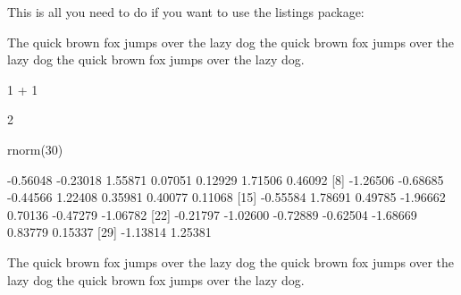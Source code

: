 \documentclass{article}\usepackage{graphicx, color}
\begin{document}
This is all you need to do if you want to use the listings package:




The quick brown fox jumps over the lazy dog the quick brown fox jumps over the
lazy dog the quick brown fox jumps over the lazy dog.

\begin{Schunk}
\begin{Sinput}
1 + 1
\end{Sinput}
\begin{Soutput}
[1] 2
\end{Soutput}
\begin{Sinput}
rnorm(30)
\end{Sinput}
\begin{Soutput}
 [1] -0.56048 -0.23018  1.55871  0.07051  0.12929  1.71506  0.46092
 [8] -1.26506 -0.68685 -0.44566  1.22408  0.35981  0.40077  0.11068
[15] -0.55584  1.78691  0.49785 -1.96662  0.70136 -0.47279 -1.06782
[22] -0.21797 -1.02600 -0.72889 -0.62504 -1.68669  0.83779  0.15337
[29] -1.13814  1.25381
\end{Soutput}
\end{Schunk}


The quick brown fox jumps over the lazy dog the quick brown fox jumps over the
lazy dog the quick brown fox jumps over the lazy dog.
\end{document}
